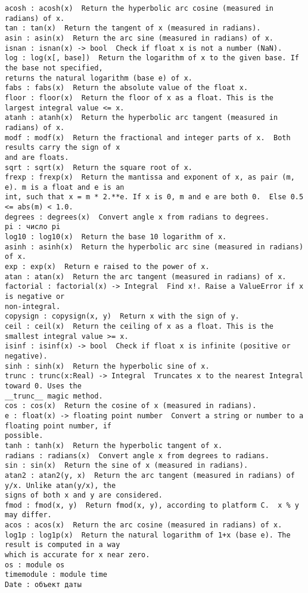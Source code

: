 \begin{verbatim}
acosh : acosh(x)  Return the hyperbolic arc cosine (measured in radians) of x.
tan : tan(x)  Return the tangent of x (measured in radians).
asin : asin(x)  Return the arc sine (measured in radians) of x.
isnan : isnan(x) -> bool  Check if float x is not a number (NaN).
log : log(x[, base])  Return the logarithm of x to the given base. If the base not specified, 
returns the natural logarithm (base e) of x.
fabs : fabs(x)  Return the absolute value of the float x.
floor : floor(x)  Return the floor of x as a float. This is the largest integral value <= x.
atanh : atanh(x)  Return the hyperbolic arc tangent (measured in radians) of x.
modf : modf(x)  Return the fractional and integer parts of x.  Both results carry the sign of x 
and are floats.
sqrt : sqrt(x)  Return the square root of x.
frexp : frexp(x)  Return the mantissa and exponent of x, as pair (m, e). m is a float and e is an 
int, such that x = m * 2.**e. If x is 0, m and e are both 0.  Else 0.5 <= abs(m) < 1.0.
degrees : degrees(x)  Convert angle x from radians to degrees.
pi : число pi
log10 : log10(x)  Return the base 10 logarithm of x.
asinh : asinh(x)  Return the hyperbolic arc sine (measured in radians) of x.
exp : exp(x)  Return e raised to the power of x.
atan : atan(x)  Return the arc tangent (measured in radians) of x.
factorial : factorial(x) -> Integral  Find x!. Raise a ValueError if x is negative or 
non-integral.
copysign : copysign(x, y)  Return x with the sign of y.
ceil : ceil(x)  Return the ceiling of x as a float. This is the smallest integral value >= x.
isinf : isinf(x) -> bool  Check if float x is infinite (positive or negative).
sinh : sinh(x)  Return the hyperbolic sine of x.
trunc : trunc(x:Real) -> Integral  Truncates x to the nearest Integral toward 0. Uses the 
__trunc__ magic method.
cos : cos(x)  Return the cosine of x (measured in radians).
e : float(x) -> floating point number  Convert a string or number to a floating point number, if 
possible.
tanh : tanh(x)  Return the hyperbolic tangent of x.
radians : radians(x)  Convert angle x from degrees to radians.
sin : sin(x)  Return the sine of x (measured in radians).
atan2 : atan2(y, x)  Return the arc tangent (measured in radians) of y/x. Unlike atan(y/x), the 
signs of both x and y are considered.
fmod : fmod(x, y)  Return fmod(x, y), according to platform C.  x % y may differ.
acos : acos(x)  Return the arc cosine (measured in radians) of x.
log1p : log1p(x)  Return the natural logarithm of 1+x (base e). The result is computed in a way 
which is accurate for x near zero.
os : module os
timemodule : module time
Date : объект даты

\end{verbatim}
